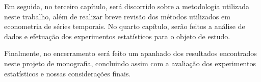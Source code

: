 Em seguida, no terceiro capítulo, será discorrido sobre a metodologia utilizada neste trabalho, além de realizar breve revisão dos métodos utilizados em econometria de séries temporais. No quarto capítulo, serão feitos a análise de dados e efetuação dos experimentos estatísticos para o objeto de estudo.

Finalmente, no encerramento será feito um apanhado dos resultados encontrados neste projeto de monografia, concluindo assim com a avaliação dos experimentos estatísticos e nossas considerações finais.


